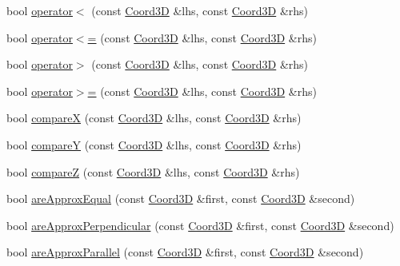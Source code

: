 \begin{DoxyCompactItemize}
bool \hyperlink{namespaceMcCAD_1_1Geometry_af0f1e06a8bb9d86b000cc831eb9cb2d2}{operator$<$} (const \hyperlink{classMcCAD_1_1Geometry_1_1Coord3D}{Coord3D} \&lhs, const \hyperlink{classMcCAD_1_1Geometry_1_1Coord3D}{Coord3D} \&rhs)
\item 
bool \hyperlink{namespaceMcCAD_1_1Geometry_a2e573b3440f9f966af986a850ca62568}{operator$<$=} (const \hyperlink{classMcCAD_1_1Geometry_1_1Coord3D}{Coord3D} \&lhs, const \hyperlink{classMcCAD_1_1Geometry_1_1Coord3D}{Coord3D} \&rhs)
\item 
bool \hyperlink{namespaceMcCAD_1_1Geometry_a467cbcc1ae805c013105fbe50302ac10}{operator$>$} (const \hyperlink{classMcCAD_1_1Geometry_1_1Coord3D}{Coord3D} \&lhs, const \hyperlink{classMcCAD_1_1Geometry_1_1Coord3D}{Coord3D} \&rhs)
\item 
bool \hyperlink{namespaceMcCAD_1_1Geometry_a21f2ecd5844f82afa22167ef4b497c7e}{operator$>$=} (const \hyperlink{classMcCAD_1_1Geometry_1_1Coord3D}{Coord3D} \&lhs, const \hyperlink{classMcCAD_1_1Geometry_1_1Coord3D}{Coord3D} \&rhs)
\item 
bool \hyperlink{namespaceMcCAD_1_1Geometry_a96401f35436a80b526b6a785fda6742d}{compareX} (const \hyperlink{classMcCAD_1_1Geometry_1_1Coord3D}{Coord3D} \&lhs, const \hyperlink{classMcCAD_1_1Geometry_1_1Coord3D}{Coord3D} \&rhs)
\item 
bool \hyperlink{namespaceMcCAD_1_1Geometry_af7f009e085c930ab1649c9030ba3cedb}{compareY} (const \hyperlink{classMcCAD_1_1Geometry_1_1Coord3D}{Coord3D} \&lhs, const \hyperlink{classMcCAD_1_1Geometry_1_1Coord3D}{Coord3D} \&rhs)
\item 
bool \hyperlink{namespaceMcCAD_1_1Geometry_a2e427f654d7794d0f8cce7a0d0d06c41}{compareZ} (const \hyperlink{classMcCAD_1_1Geometry_1_1Coord3D}{Coord3D} \&lhs, const \hyperlink{classMcCAD_1_1Geometry_1_1Coord3D}{Coord3D} \&rhs)
\item 
bool \hyperlink{namespaceMcCAD_1_1Geometry_a65700a8377f9976917679d72ae40a16a}{are\+Approx\+Equal} (const \hyperlink{classMcCAD_1_1Geometry_1_1Coord3D}{Coord3D} \&first, const \hyperlink{classMcCAD_1_1Geometry_1_1Coord3D}{Coord3D} \&second)
\item 
bool \hyperlink{namespaceMcCAD_1_1Geometry_ace2c1ac6eb161af705b8c6bc357f4e47}{are\+Approx\+Perpendicular} (const \hyperlink{classMcCAD_1_1Geometry_1_1Coord3D}{Coord3D} \&first, const \hyperlink{classMcCAD_1_1Geometry_1_1Coord3D}{Coord3D} \&second)
\item 
bool \hyperlink{namespaceMcCAD_1_1Geometry_a83dc44516ddc66c937c14bc4b29a0876}{are\+Approx\+Parallel} (const \hyperlink{classMcCAD_1_1Geometry_1_1Coord3D}{Coord3D} \&first, const \hyperlink{classMcCAD_1_1Geometry_1_1Coord3D}{Coord3D} \&second)

\end{DoxyCompactItemize}
